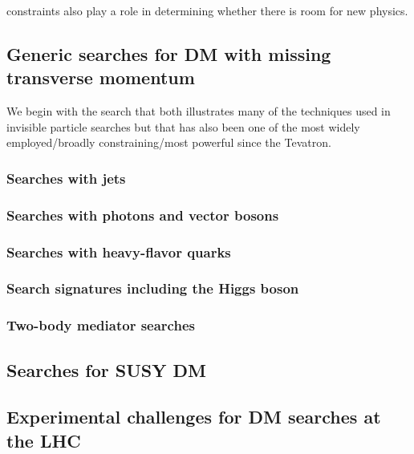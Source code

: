   constraints also play a role in determining whether there is room for new physics. 

\subsection{Generic searches for DM with missing transverse momentum}
\label{sec:results_monoXSearches}

We begin with the search that both illustrates many of the techniques used in invisible particle searches but that has also been one of the most widely employed/broadly constraining/most powerful since the Tevatron. 

\subsubsection{Searches with jets}

\subsubsection{Searches with photons and vector bosons}



\subsubsection{Searches with heavy-flavor quarks}

\subsubsection{Search signatures including the Higgs boson}

\subsubsection{Two-body mediator searches}

\subsection{Searches for SUSY DM}
\label{sec:results_SUSYSearches}

\subsection{Experimental challenges for DM searches at the LHC}
\label{sec:experimentalChallenges}

